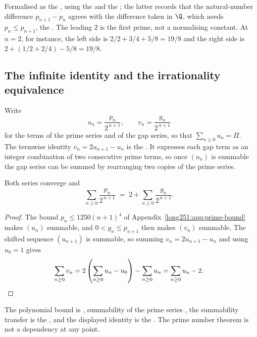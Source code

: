 \documentclass[11pt]{article}
\begin{document}
\noindent Formalised as the
, using the
 and the
; the latter records that the natural-number difference
$p_{n+1}-p_n$ agrees with the difference taken in $\Q$, which needs
$p_n\le p_{n+1}$, the
.  The leading $2$ is the first prime, not a normalising constant.
At $n=2$, for instance, the left side is $2/2+3/4+5/8=19/8$ and the right side
is $2+(1/2+2/4)-5/8=19/8$.

\subsection{The infinite identity and the irrationality equivalence}\label{long251:sec:infinite}

Write
\[
 u_n=\frac{p_n}{2^{\,n+1}},\qquad
 v_n=\frac{g_n}{2^{\,n+1}}
\]
for the terms of the prime series and of the gap series, so that
$\sum_{n\ge0}u_n=\Pi$.  The termwise identity $v_n=2u_{n+1}-u_n$ is the
.  It expresses each gap term as an integer combination of
two consecutive prime terms, so once $(u_n)$ is summable the gap series can be
summed by rearranging two copies of the prime series.

\begin{theorem}\label{long251:res:infinite}
Both series converge and
\[
 \sum_{n\ge0}\frac{p_n}{2^{\,n+1}}
 \;=\;2+\sum_{n\ge0}\frac{g_n}{2^{\,n+1}} .
\]
\end{theorem}

\begin{proof}
The bound $p_n\le1250(n+1)^4$ of Appendix~\ref{long251:app:prime-bound} makes $(u_n)$
summable, and $0<g_n\le p_{n+1}$ then makes $(v_n)$ summable.  The shifted
sequence $(u_{n+1})$ is summable, so summing $v_n=2u_{n+1}-u_n$ and using
$u_0=1$ gives
\[
 \sum_{n\ge0}v_n
 =2\left(\sum_{n\ge0}u_n-u_0\right)-\sum_{n\ge0}u_n
 =\sum_{n\ge0}u_n-2 . \qedhere
\]
\end{proof}

\noindent The polynomial bound is
, summability of the prime series
,
the summability transfer is the
, and the displayed identity is the
.  The prime number theorem is not a dependency at any
point.
\end{document}
